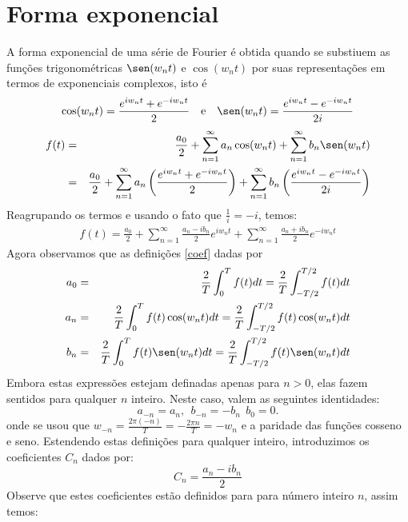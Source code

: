 \section{Forma exponencial}
A forma exponencial de uma série de Fourier é obtida quando se substiuem as funções trigonométricas $\sen(w_nt)$ e $\cos(w_nt)$ por suas representações em termos de exponenciais complexos, isto é
\begin{equation}\cos(w_nt)=\frac{e^{iw_nt}+ e^{-iw_nt}}{2}~~~\hbox{e}~~~\sen(w_nt)=\frac{e^{iw_nt}- e^{-iw_nt}}{2i}\end{equation}
\begin{eqnarray*}
f(t)&=&\frac{a_0}{2}+\sum_{n=1}^\infty a_n\cos(w_n t)+\sum_{n=1}^\infty b_n\sen(w_n t)\\
&=&\frac{a_0}{2}+\sum_{n=1}^\infty a_n\left(\frac{e^{iw_nt}+ e^{-iw_nt}}{2}\right)+\sum_{n=1}^\infty b_n\left(\frac{e^{iw_nt}- e^{-iw_nt}}{2i}\right)\\
\end{eqnarray*}
Reagrupando os termos e usando o fato que $\frac{1}{i}=-i$, temos:
\begin{eqnarray}\label{form_exp_1}
f(t)=\frac{a_0}{2}+\sum_{n=1}^\infty \frac{a_n-ib_n}{2}e^{iw_nt}+\sum_{n=1}^\infty \frac{a_n+ib_n}{2}e^{-iw_nt}
\end{eqnarray}
Agora observamos que as definições \ref{coef} dadas por  
\begin{eqnarray*}
   a_0&=& \frac{2}{T}\int_0^T f(t)dt = \frac{2}{T}\int_{-T/2}^{T/2} f(t)dt\\
   a_n&=& \frac{2}{T}\int_0^T f(t)\cos(w_n t)dt = \frac{2}{T}\int_{-T/2}^{T/2} f(t)\cos(w_nt)dt\\
   b_n&=& \frac{2}{T}\int_0^T f(t)\sen(w_n t)dt = \frac{2}{T}\int_{-T/2}^{T/2} f(t)\sen(w_nt)dt
  \end{eqnarray*}
Embora estas expressões estejam definadas apenas para $n>0$, elas fazem sentidos para qualquer $n$ inteiro. Neste caso, valem as seguintes identidades:
\begin{equation}a_{-n}=a_n,~~b_{-n}=-b_{n}~~b_0=0.\end{equation}
onde se usou que $w_{-n}=\frac{2\pi (-n)}{T}=-\frac{2\pi n}{T}=-w_n$ e a paridade das funções cosseno e seno.
Estendendo estas definições para qualquer inteiro, introduzimos os coeficientes $C_n$ dados por:
\begin{equation}\label{def_cn}
C_n = \frac{a_n - ib_n}{2}
\end{equation}
Observe que estes coeficientes estão definidos para para número inteiro $n$, assim temos:

